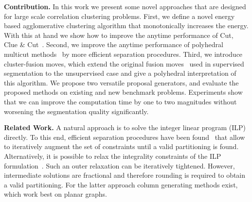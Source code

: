 \vspace{0.1cm}
\noindent \textbf{Contribution.}
In this work we present some novel approaches that are designed for large scale correlation clustering problems.
First, we define a novel energy based agglomerative clustering algorithm that monotonically increases the energy.
With this at hand we show how to improve the anytime performance of Cut, Clue \& Cut~\cite{beier_2014_cvpr}.
%
Second, we improve the anytime performance of polyhedral multicut methods~\cite{kappes_2013_arxiv} by more efficient separation procedures.
%
Third, we introduce cluster-fusion moves, which extend the original fusion moves~\cite{Lempitsky-2010} 
used in supervised segmentation to the unsupervised case and give a polyhedral interpretation of this algorithm.
We propose two versatile proposal generators, and evaluate the proposed methods on existing and new benchmark problems.
Experiments show that we can improve the computation time by one to two magnitudes without worsening the segmentation 
quality significantly.
 
\vspace{0.1cm}
\noindent \textbf{Related Work.}
A natural approach is to solve the integer linear program (ILP) directly. 
To this end, efficient separation procedures have been found~\cite{kappes_2011_emmcvpr,kappes_2013_arxiv} that allow to iteratively augment the set of constraints until a valid partitioning is found. 
Alternatively, it is possible to relax the integrality constraints of the ILP formulation~\cite{kappes_2013_arxiv}. 
Such an outer relaxation can be iteratively tightened. However, intermediate solutions are fractional and therefore rounding is required to obtain a valid partitioning.
For the latter approach column generating methods exist, which work best on planar \cite{yarkony_2012_eccv} graphs. %

